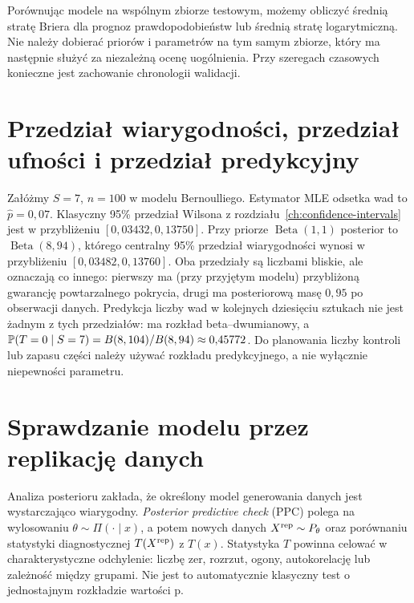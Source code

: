 \begin{uwaga}
Porównując modele na wspólnym zbiorze testowym, możemy
obliczyć średnią stratę Briera dla prognoz prawdopodobieństw
lub średnią stratę logarytmiczną. Nie należy dobierać priorów
i parametrów na tym samym zbiorze, który ma następnie służyć
za niezależną ocenę uogólnienia. Przy szeregach czasowych
konieczne jest zachowanie chronologii walidacji.
\end{uwaga}

\section{Przedział wiarygodności, przedział ufności i przedział predykcyjny}
\begin{przyklad}
Załóżmy $S=7$, $n=100$ w modelu Bernoulliego. Estymator MLE
odsetka wad to $\widehat p=0{,}07$. Klasyczny 95\% przedział
Wilsona z rozdziału~\ref{ch:confidence-intervals} jest w przybliżeniu
$[0{,}03432,0{,}13750]$. Przy priorze
$\operatorname{Beta}(1,1)$ posterior to
$\operatorname{Beta}(8,94)$, którego centralny 95\%
przedział wiarygodności wynosi w przybliżeniu
$[0{,}03482,0{,}13760]$.
Oba przedziały są liczbami bliskie, ale oznaczają co innego:
pierwszy ma (przy przyjętym modelu) przybliżoną gwarancję
powtarzalnego pokrycia, drugi ma posteriorową masę $0{,}95$
po obserwacji danych. Predykcja liczby wad w kolejnych
dziesięciu sztukach nie jest żadnym z tych przedziałów:
ma rozkład beta--dwumianowy, a
$\mathbb P(T=0\mid S=7)=B(8,104)/B(8,94)\approx0{,}45772$.
Do planowania liczby kontroli lub zapasu części należy używać
rozkładu predykcyjnego, a nie wyłącznie niepewności parametru.
\end{przyklad}

\section{Sprawdzanie modelu przez replikację danych}
Analiza posterioru zakłada, że określony model generowania
danych jest wystarczająco wiarygodny. \emph{Posterior predictive
check} (PPC) polega na wylosowaniu $\theta\sim\Pi(\cdot\mid x)$,
a potem nowych danych $X^{\rm rep}\sim P_\theta$ oraz
porównaniu statystyki diagnostycznej $T(X^{\rm rep})$ z $T(x)$.
Statystyka $T$ powinna celować w charakterystyczne odchylenie:
liczbę zer, rozrzut, ogony, autokorelację lub zależność między
grupami. Nie jest to automatycznie klasyczny test o jednostajnym
rozkładzie wartości p.


